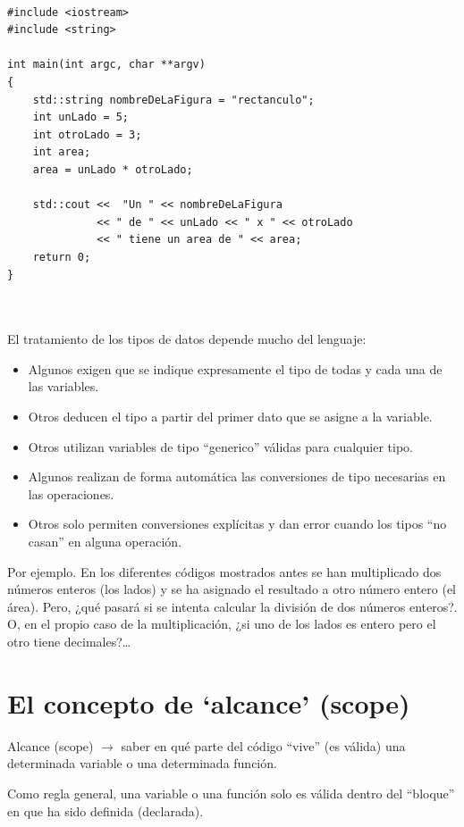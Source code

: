 \documentclass[spanish,12pt,a4paper,final,oneside]{book}
\begin{document}
\begin{lstlisting}[frame=single, caption=lenguaje C++]

#include <iostream>
#include <string>

int main(int argc, char **argv)
{
    std::string nombreDeLaFigura = "rectanculo";
    int unLado = 5;
    int otroLado = 3;
    int area;
    area = unLado * otroLado;
    
    std::cout <<  "Un " << nombreDeLaFigura 
              << " de " << unLado << " x " << otroLado 
              << " tiene un area de " << area;
    return 0;
}



\end{lstlisting}

 
El tratamiento de los tipos de datos depende mucho del lenguaje:
\begin{itemize}
\item Algunos exigen que se indique expresamente el tipo de todas y cada una de las variables.
\item Otros deducen el tipo a partir del primer dato que se asigne a la variable. 
\item Otros utilizan variables de tipo ``generico'' válidas para cualquier tipo.
\item Algunos realizan de forma automática las conversiones de tipo necesarias en las operaciones. 
\item Otros solo permiten conversiones explícitas y dan error cuando los tipos ``no casan'' en alguna operación.
\end{itemize}

Por ejemplo. En los diferentes códigos mostrados antes se han multiplicado dos números enteros (los lados) y se ha asignado el resultado a otro número entero (el área). Pero, ¿qué pasará si se intenta calcular la división de dos números enteros?. O, en el propio caso de la multiplicación, ¿si uno de los lados es entero pero el otro tiene decimales?\ldots



\section{El concepto de `alcance' (scope)}
Alcance (scope) $\rightarrow$ saber en qué parte del código ``vive'' (es válida) una determinada variable o una determinada función.

Como regla general, una variable o una  función solo es válida dentro del ``bloque'' en que ha sido definida (declarada).
\end{document}
